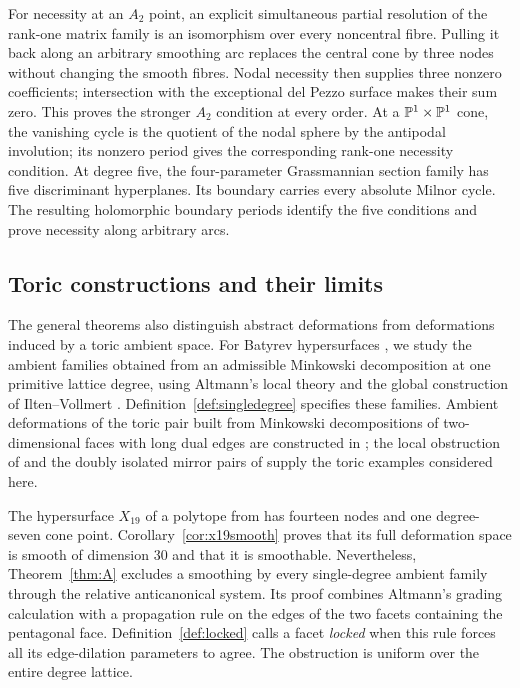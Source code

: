 For necessity at an $A_2$ point, an explicit simultaneous partial
resolution of the rank-one matrix family is an isomorphism over every
noncentral fibre.  Pulling it back along an arbitrary smoothing arc
replaces the central cone by three nodes without changing the smooth
fibres.  Nodal necessity then supplies three nonzero coefficients;
intersection with the exceptional del Pezzo surface makes their sum
zero.  This proves the stronger $A_2$ condition at every order.
At a $\mathbb{P}^1\times\mathbb{P}^1$ cone, the vanishing cycle is the quotient
of the nodal sphere by the antipodal involution; its nonzero period
gives the corresponding rank-one necessity condition.
At degree five, the four-parameter Grassmannian section family
has five discriminant hyperplanes.  Its boundary carries every
absolute Milnor cycle.  The resulting holomorphic boundary periods
identify the five conditions and prove necessity along arbitrary arcs.

\subsection{Toric constructions and their limits}
The general theorems also distinguish abstract deformations from
deformations induced by a toric ambient space.  For Batyrev
hypersurfaces \cite{Batyrev94}, we study the ambient families obtained
from an admissible Minkowski decomposition at one primitive lattice
degree, using Altmann's local theory and the global construction of
Ilten--Vollmert \cite{Altmann97,IV12}.  Definition~\ref{def:singledegree}
specifies these families.  Ambient deformations of the toric pair built from
Minkowski decompositions of two-dimensional faces with long dual edges are
constructed in \cite{PaperII}; the local obstruction of \cite{PaperI} and the
doubly isolated mirror pairs of \cite{PaperIII} supply the toric examples
considered here.

The hypersurface $X_{19}$ of a polytope from \cite[\S5.3]{PaperIII} has
fourteen nodes and one degree-seven cone point.  Corollary~\ref{cor:x19smooth} proves that its full deformation
space is smooth of dimension $30$ and that it is smoothable.
Nevertheless, Theorem~\ref{thm:A} excludes a smoothing by every
single-degree ambient family through the relative anticanonical system.
Its proof combines Altmann's grading calculation with a propagation
rule on the edges of the two facets containing the pentagonal face.
Definition~\ref{def:locked} calls a facet \emph{locked} when this rule
forces all its edge-dilation parameters to agree.  The obstruction is
uniform over the entire degree lattice.

